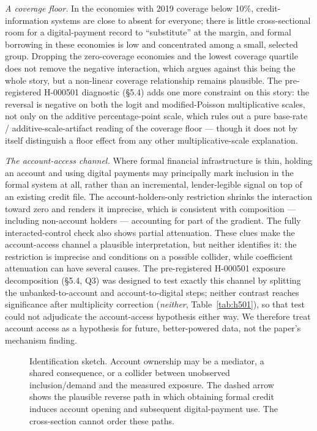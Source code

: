 \emph{A coverage floor.} In the \ThinCoverageEconomies{} economies with 2019 coverage below
10\%, credit-information systems are close to absent for everyone; there is little
cross-sectional room for a digital-payment record to ``substitute'' at the margin, and
formal borrowing in these economies is low and concentrated among a small, selected group.
Dropping the zero-coverage economies and the lowest coverage quartile does not remove the
negative interaction, which argues against this being the whole story, but a non-linear
coverage relationship remains plausible. The pre-registered H-000501 diagnostic (\S5.4) adds
one more constraint on this story: the reversal is negative on both the logit and
modified-Poisson multiplicative scales, not only on the additive percentage-point scale, which
rules out a pure base-rate / additive-scale-artifact reading of the coverage floor --- though
it does not by itself distinguish a floor effect from any other multiplicative-scale
explanation.

\emph{The account-access channel.} Where formal financial infrastructure is thin, holding an
account and using digital payments may principally mark inclusion in the formal system at
all, rather than an incremental, lender-legible signal on top of an existing credit file.
The account-holders-only restriction shrinks the interaction toward zero and renders it
imprecise, which is consistent with composition --- including non-account holders ---
accounting for part of the gradient. The fully interacted-control check also shows partial
attenuation. These clues make the account-access channel a plausible interpretation, but
neither identifies it: the restriction is imprecise and conditions on a possible collider,
while coefficient attenuation can have several causes. The pre-registered H-000501 exposure
decomposition (\S5.4, Q3) was designed to test exactly this channel by splitting the
unbanked-to-account and account-to-digital steps; neither contrast reaches significance after
multiplicity correction (\emph{neither}, Table~\ref{tab:h501}), so that test could not
adjudicate the account-access hypothesis either way. We therefore treat account access as a
hypothesis for future, better-powered data, not the paper's mechanism finding.

\begin{figure}[htbp]
\centering
{}
\caption{Identification sketch. Account ownership may be a mediator, a shared consequence,
or a collider between unobserved inclusion/demand and the measured exposure. The dashed arrow
shows the plausible reverse path in which obtaining formal credit induces account opening and
subsequent digital-payment use. The cross-section cannot order these paths.}
\label{fig:dag}
\end{figure}

